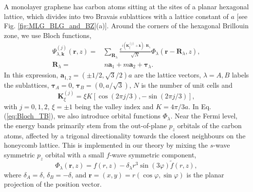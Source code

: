 \documentclass[showpacs,aps,prb,reprint,twocolumn]{revtex4-1}
\begin{document}
A monolayer graphene has carbon atoms sitting at the sites of a planar hexagonal lattice, which divides into two Bravais sublattices with a lattice constant of $a$ [see Fig. \ref{fig:MLG_BLG_and_BZ}(a)]. Around the corners of the hexagonal Brillouin zone, we use Bloch functions,
\begin{align}\label{eq:Bloch_TB}
\Psi_{\lambda,\boldsymbol{k}}^{(j)}(\boldsymbol{r},z)=&
\sum_{\boldsymbol{R}_\lambda}
\frac{
e^{i(\boldsymbol{K}_\xi^{(j)}+\boldsymbol{k})\cdot\boldsymbol{R}_\lambda} }{\sqrt{N}}
\Phi_{\lambda}(\boldsymbol{r}-\boldsymbol{R}_\lambda,z),
\\
\boldsymbol{R}_\lambda=&\,
n\boldsymbol{a}_1+m\boldsymbol{a}_2+\boldsymbol{\tau}_\lambda.\nonumber
\end{align}
In this expression, $\boldsymbol{a}_{1,2}=(\pm1/2,\sqrt{3}/2)a$ are the lattice vectors, $\lambda=A,B$ labels the sublattices, $\boldsymbol{\tau}_A = 0$, $\boldsymbol{\tau}_B = (0,a/\sqrt{3})$, $N$ is the number of unit cells and 
\begin{equation}
\boldsymbol{K}^{(j)}_\xi = \xi K [\cos(2\pi j/3), -\sin(2\pi j/3)],
\end{equation}
with $j = 0, 1, 2$, $\xi = \pm 1$ being the valley index and $K = 4\pi/3a$. In Eq. (\ref{eq:Bloch_TB}), we also introduce orbital functions $\Phi_\lambda$. Near the Fermi level, the energy bands primarily stem from the out-of-plane $p_z$ orbitals of the carbon atoms, affected by a trigonal directionality towards the closest neighbours on the honeycomb lattice. This is implemented in our theory by mixing the $s$-wave symmetric $p_z$ orbital with a small $f$-wave symmetric component,
\begin{equation}\label{eq:PzOrbitals}
\Phi_\lambda(\boldsymbol{r},z) = 
f(r,z) - \delta_\lambda r^3 
\sin(3\varphi)
\tilde{f}(r,z),
\end{equation}
where $\delta_A = \delta $, $\delta_B = - \delta$, and $\boldsymbol{r}=(x,y)=r(\cos\varphi,\sin\varphi)$ is the planar projection of the position vector.
\end{document}
